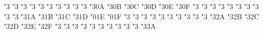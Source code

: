    \let\restriction\upharpoonright
   \let\Doteq\doteqdot
   \let\doublecup\Cup
   \let\doublecap\Cap
   \let\llless\lll
   \let\gggtr\ggg
   \let\Box=\square %
   \let\Box=\square %


\mathchardef \lvertneqq   "3
\mathchardef \gvertneqq   "3
\mathchardef \nleq   "3
\mathchardef \ngeq   "3
\mathchardef \nless   "3
\mathchardef \ngtr   "3
\mathchardef \nprec   "3
\mathchardef \nsucc   "3
\mathchardef \lneqq   "3
\mathchardef \gneqq   "3
\mathchardef \nleqslant   "3\amsbfam 0A
\mathchardef \ngeqslant   "3\amsbfam 0B
\mathchardef \lneq   "3\amsbfam 0C
\mathchardef \gneq   "3\amsbfam 0D
\mathchardef \npreceq   "3\amsbfam 0E
\mathchardef \nsucceq   "3\amsbfam 0F
\mathchardef \precnsim   "3
\mathchardef \succnsim   "3
\mathchardef \lnsim   "3
\mathchardef \gnsim   "3
\mathchardef \nleqq   "3
\mathchardef \ngeqq   "3
\mathchardef \precneqq   "3
\mathchardef \succneqq   "3
\mathchardef \precnapprox   "3
\mathchardef \succnapprox   "3
\mathchardef \lnapprox   "3\amsbfam 1A
\mathchardef \gnapprox   "3\amsbfam 1B
\mathchardef \nsim   "3\amsbfam 1C
\mathchardef \ncong   "3\amsbfam 1D
\mathchardef \diagup   "0\amsbfam 1E
\mathchardef \diagdown   "0\amsbfam 1F
\mathchardef \varsubsetneq   "3
\mathchardef \varsupsetneq   "3
\mathchardef \nsubseteqq   "3
\mathchardef \nsupseteqq   "3
\mathchardef \subsetneqq   "3
\mathchardef \supsetneqq   "3
\mathchardef \varsubsetneqq   "3
\mathchardef \varsupsetneqq   "3
\mathchardef \subsetneq   "3
\mathchardef \supsetneq   "3
\mathchardef \nsubseteq   "3\amsbfam 2A
\mathchardef \nsupseteq   "3\amsbfam 2B
\mathchardef \nparallel   "3\amsbfam 2C
\mathchardef \nmid   "3\amsbfam 2D
\mathchardef \nshortmid   "3\amsbfam 2E
\mathchardef \nshortparallel   "3\amsbfam 2F
\mathchardef \nvdash   "3
\mathchardef \nVdash   "3
\mathchardef \nvDash   "3
\mathchardef \nVDash   "3
\mathchardef \ntrianglerighteq   "3
\mathchardef \ntrianglelefteq   "3
\mathchardef \ntriangleleft   "3
\mathchardef \ntriangleright   "3
\mathchardef \nleftarrow   "3
\mathchardef \nrightarrow   "3
\mathchardef \nLeftarrow   "3\amsbfam 3A

